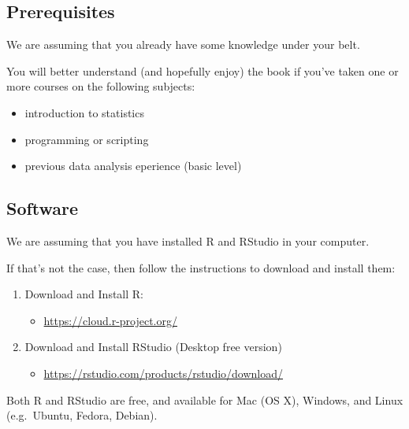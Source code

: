 \documentclass[
]{book}
\providecommand{\tightlist}{%
  \setlength{\itemsep}{0pt}\setlength{\parskip}{0pt}}
\begin{document}
\hypertarget{prerequisites}{%
\subsection*{Prerequisites}\label{prerequisites}}

We are assuming that you already have some knowledge under your belt.

You will better understand (and hopefully enjoy) the book if you've taken one
or more courses on the following subjects:

\begin{itemize}
\tightlist
\item
  introduction to statistics
\item
  programming or scripting
\item
  previous data analysis eperience (basic level)
\end{itemize}

\hypertarget{software}{%
\subsection*{Software}\label{software}}

We are assuming that you have installed R and RStudio in your computer.

If that's not the case,
then follow the instructions to download and install them:

\begin{enumerate}
\def\labelenumi{\arabic{enumi})}
\tightlist
\item
  Download and Install R:

  \begin{itemize}
  \tightlist
  \item
    \url{https://cloud.r-project.org/}
  \end{itemize}
\item
  Download and Install RStudio (Desktop free version)

  \begin{itemize}
  \tightlist
  \item
    \url{https://rstudio.com/products/rstudio/download/}
  \end{itemize}
\end{enumerate}

Both R and RStudio are free, and available for Mac (OS X), Windows, and Linux
(e.g.~Ubuntu, Fedora, Debian).
\end{document}
